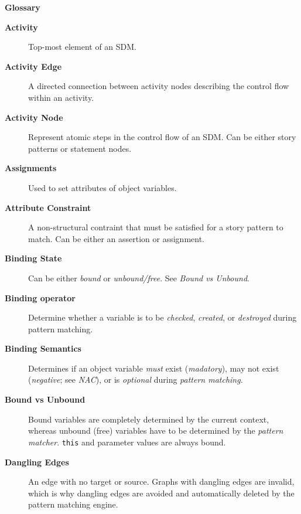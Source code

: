 \newpage
{}
{}
\hypertarget{glossary}{}

\vspace{1cm}
{\Huge \bf Glossary}
\vspace{1cm}

\begin{description}

\item[\bf Activity]
Top-most element of an SDM.

\item[\bf Activity Edge]
A directed connection between activity nodes describing the control flow within an activity.

\item[\bf Activity Node]
Represent atomic steps in the control flow of an SDM. Can be either story patterns or statement nodes.

\item[\bf Assignments]
Used to set attributes of object variables.

\item[\bf Attribute Constraint]
A non-structural contraint that must be satisfied for a story pattern to match. Can be either an assertion or assignment.

\item[\bf Binding State]
Can be either \emph{bound} or \emph{unbound/free}. See \emph{Bound vs Unbound}.

\item[\bf Binding operator]
Determine whether a variable is to be \emph{checked}, \emph{created}, or \emph{destroyed} during pattern matching.

\item[\bf Binding Semantics]
Determines if an object variable \emph{must} exist (\emph{madatory}), may not exist (\emph{negative}; see \emph{NAC}), or is \emph{optional} during
\emph{pattern matching}.

\item[\bf Bound vs Unbound]
Bound variables are completely determined by the current context, whereas unbound (free) variables have to be determined by the \emph{pattern matcher}.
\texttt{this} and parameter values are always bound.

\item[\bf Dangling Edges]
An edge with no target or source. Graphs with dangling edges are invalid, which is why dangling edges are avoided and automatically deleted by the pattern
matching engine.


\end{description}
